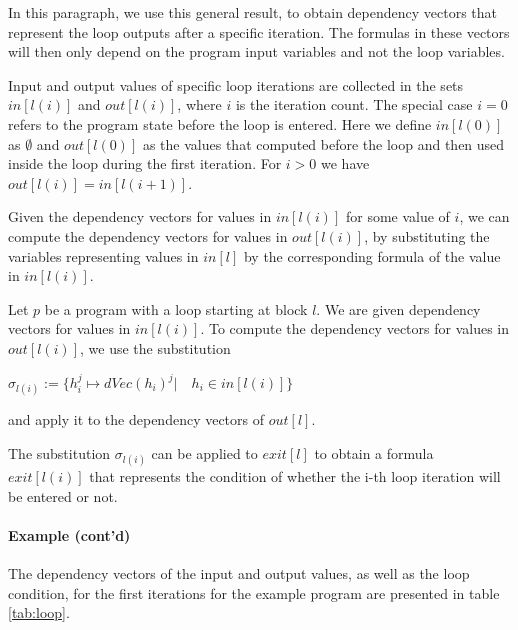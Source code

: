 In this paragraph, we use this general result, to obtain dependency vectors that represent the loop outputs after a specific iteration. The formulas in these vectors will then only depend on the program input variables and not the loop variables.

Input and output values of specific loop iterations are collected in the sets $in[l(i)]$ and $out[l(i)]$, where $i$ is the iteration count. The special case $i = 0$ refers to the program state before the loop is entered. Here we define $in[l(0)]$ as $\emptyset$ and $out[l(0)]$ as the values that computed before the loop and then used inside the loop during the first iteration. For $i > 0$ we have $out[l(i)] = in[l(i + 1)]$.

Given the dependency vectors for values in $in[l(i)]$ for some value of $i$, we can compute the dependency vectors for values in $out[l(i)]$, by substituting the variables representing values in $in[l]$ by the corresponding formula of the value in $in[l(i)]$.

\begin{definition}
    Let $p$ be a program with a loop starting at block $l$. We are given dependency vectors for values in $in[l(i)]$. To compute the dependency vectors for values in $out[l(i)]$, we use the substitution
    \begin{center}
        $\sigma_{l(i)} := \{h_i^j \mapsto dVec(h_i)^j | \quad h_i \in in[l(i)]\}$
    \end{center}
    and apply it to the dependency vectors of $out[l]$.
\end{definition}

The substitution $\sigma_{l(i)}$ can be applied to $exit[l]$ to obtain a formula $exit[l(i)]$ that represents the condition of whether the i-th loop iteration will be entered or not.

\paragraph{Example (cont'd)} The dependency vectors of the input and output values, as well as the loop condition, for the first iterations for the example program are presented in table \ref{tab:loop}.

